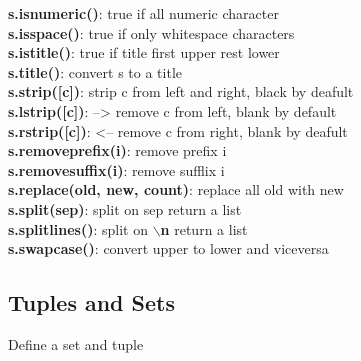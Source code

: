 \documentclass{cheatsheet}
\begin{document}
    \textbf{s.isnumeric()}: true if all numeric character \\
    \textbf{s.isspace()}: true if only whitespace characters \\
    \textbf{s.istitle()}: true if title first upper rest lower \\
    \textbf{s.title()}: convert s to a title \\
    \textbf{s.strip([c])}: strip c from left and right, black by deafult \\
    \textbf{s.lstrip([c])}: --> remove c from left, blank by default \\
    \textbf{s.rstrip([c])}: <-- remove c from right, blank by deafult \\
    \textbf{s.removeprefix(i)}: remove prefix i\\
    \textbf{s.removesuffix(i)}: remove sufflix i \\
    \textbf{s.replace(old, new, count)}: replace all old with new \\
    \textbf{s.split(sep)}: split on sep return a list \\
    \textbf{s.splitlines()}: split on \textbf{$\backslash$n} return a list \\
    \textbf{s.swapcase()}: convert upper to lower and viceversa

    \subsection{Tuples and Sets}
    Define a set and tuple
\end{document}
